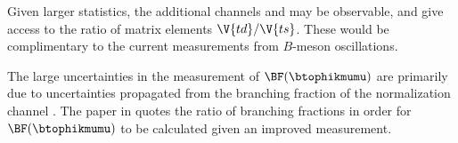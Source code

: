 
Given larger statistics, the additional channels \decay{\Bp}{\Kp\Km\pip\mumu} and
\decay{\Bp}{\pip\pipi\mumu}
may be observable, and give access to the ratio of \ckm matrix elements $\V{td}/\V{ts}$.
These would be complimentary to the current
measurements from $B$-meson oscillations.


The large uncertainties in the measurement of $\BF(\btophikmumu)$ are primarily due to
uncertainties propagated from the branching fraction of the normalization channel \btojpsiphik.
The paper in  quotes the ratio of branching fractions in order for
$\BF(\btophikmumu)$ to be calculated given an improved measurement.





